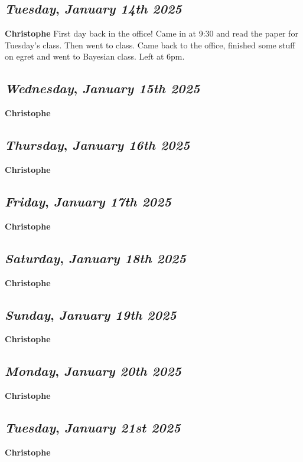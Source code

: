 \def\day{\textit{January 14th 2025}}
\def\weekday{\textit{Tuesday}}
\subsection*{\weekday, \day}
\textbf {Christophe}
First day back in the office!  Came in at 9:30 and read the paper for Tuesday's class. Then went to class. Came back to the office, finished some stuff on egret and went to Bayesian class. Left at 6pm.

\def\day{\textit{January 15th 2025}}
\def\weekday{\textit{Wednesday}}
\subsection*{\weekday, \day}
\textbf {Christophe}

\def\day{\textit{January 16th 2025}}
\def\weekday{\textit{Thursday}}
\subsection*{\weekday, \day}
\textbf {Christophe}

\def\day{\textit{January 17th 2025}}
\def\weekday{\textit{Friday}}
\subsection*{\weekday, \day}
\textbf {Christophe}

\def\day{\textit{January 18th 2025}}
\def\weekday{\textit{Saturday}}
\subsection*{\weekday, \day}
\textbf {Christophe}

\def\day{\textit{January 19th 2025}}
\def\weekday{\textit{Sunday}}
\subsection*{\weekday, \day}
\textbf {Christophe}

\def\day{\textit{January 20th 2025}}
\def\weekday{\textit{Monday}}
\subsection*{\weekday, \day}
\textbf {Christophe}

\def\day{\textit{January 21st 2025}}
\def\weekday{\textit{Tuesday}}
\subsection*{\weekday, \day}
\textbf {Christophe}

